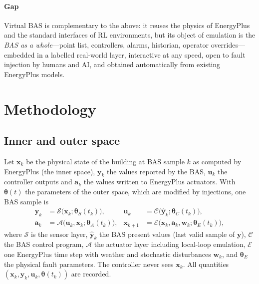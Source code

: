 \documentclass[preprint,12pt,authoryear=false]{elsarticle}
\begin{document}
\paragraph{Gap} Virtual BAS is complementary to the above: it reuses the physics of EnergyPlus and the standard
interfaces of RL environments, but its object of emulation is the \emph{BAS as a whole}---point list, controllers,
alarms, historian, operator overrides---embedded in a labelled real-world layer, interactive at any speed, open to fault
injection by humans and AI, and obtained automatically from existing EnergyPlus models.

\section{Methodology}
\label{sec:method}

\FloatBarrier
\subsection{Inner and outer space}

Let $\mathbf{x}_k$ be the physical state of the building at BAS sample $k$ as computed by EnergyPlus (the inner
space), $\mathbf{y}_k$ the values reported by the BAS, $\mathbf{u}_k$ the controller outputs and $\mathbf{a}_k$ the
values written to EnergyPlus actuators. With $\boldsymbol{\theta}(t)$ the parameters of the outer space, which are
modified by injections, one BAS sample is
\begin{align}
\mathbf{y}_k &= \mathcal{S}\big(\mathbf{x}_k;\boldsymbol{\theta}_S(t_k)\big), &
\mathbf{u}_k &= \mathcal{C}\big(\hat{\mathbf{y}}_{k};\boldsymbol{\theta}_C(t_k)\big), \label{eq:loop1}\\
\mathbf{a}_k &= \mathcal{A}\big(\mathbf{u}_k, \mathbf{x}_k;\boldsymbol{\theta}_A(t_k)\big), &
\mathbf{x}_{k+1} &= \mathcal{E}\big(\mathbf{x}_k,\mathbf{a}_k, \mathbf{w}_k;\boldsymbol{\theta}_E(t_k)\big), \label{eq:loop2}
\end{align}
where $\mathcal{S}$ is the sensor layer, $\hat{\mathbf{y}}_k$ the BAS present values (last valid sample of
$\mathbf{y}$), $\mathcal{C}$ the BAS control program, $\mathcal{A}$ the actuator layer including local-loop
emulation, $\mathcal{E}$ one EnergyPlus time step with weather and stochastic disturbances $\mathbf{w}_k$, and
$\boldsymbol{\theta}_E$ the physical fault parameters. The controller never sees $\mathbf{x}_k$. All quantities
$(\mathbf{x}_k,\mathbf{y}_k,\mathbf{u}_k,\boldsymbol{\theta}(t_k))$ are recorded.
\end{document}
